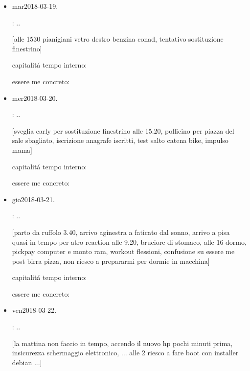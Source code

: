 \begin{itemize}
: ..

[dentista, H7, colla a ferramenta moderna,]

capitalit\'a tempo interno: 

essere me concreto: 

\item{mar}{2018-03-19}.

: ..

[alle 1530 pianigiani vetro destro benzina conad, tentativo sostituzione finestrino]

capitalit\'a tempo interno: 

essere me concreto: 

\item{mer}{2018-03-20}.

: ..

[sveglia early per sostituzione finestrino alle 15.20, pollicino per piazza del sale sbagliato, iscrizione anagrafe iscritti, test salto catena bike, impulso mama]

capitalit\'a tempo interno: 

essere me concreto: 

\item{gio}{2018-03-21}.

: ..

[parto da ruffolo 3.40, arrivo aginestra a faticato dal sonno, arrivo a pisa quasi in tempo per atro reaction alle 9.20, bruciore di stomaco, alle 16 dormo, pickpay computer e monto ram, workout flessioni, confusione su essere me post birra pizza, non riesco a prepararmi per dormie in macchina]

capitalit\'a tempo interno: 

essere me concreto: 

\item{ven}{2018-03-22}.

: ..

[la mattina non faccio in tempo, accendo il nuovo hp pochi minuti prima, insicurezza schermaggio elettronico, ... alle 2 riesco a fare boot con installer debian ...]


\end{itemize}
